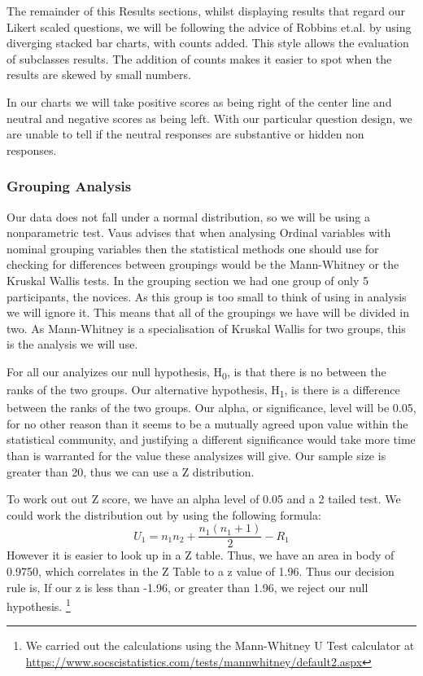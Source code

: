 The remainder of this Results sections, whilst displaying results that regard our Likert scaled questions, we will be following the advice of Robbins et.al.\cite{robbins2011plotting} by using diverging stacked bar charts, with counts added.
This style allows the evaluation of subclasses results.
The addition of counts makes it easier to spot when the results are skewed by small numbers.

In our charts we will take positive scores as being right of the center line and neutral and negative scores as being left.
With our particular question design, we are unable to tell if the neutral responses are substantive or hidden non responses\cite{blasius2001use}.

\subsubsection{Grouping Analysis}
Our data does not fall under a normal distribution, so we will be using a nonparametric test.
Vaus\cite{de2013surveys} advises that when analysing Ordinal variables with nominal grouping variables then the statistical methods one should use for checking for differences between groupings would be the Mann-Whitney\cite{mann1947test} or the Kruskal Wallis\cite{kruskal1952use} tests.
In the grouping section we had one group of only 5 participants, the novices.
As this group is too small to think of using in analysis we will ignore it.
This means that all of the groupings we have will be divided in two.
As Mann-Whitney is a specialisation of Kruskal Wallis for two groups, this is the analysis we will use.

For all our analyizes our null hypothesis, H\textsubscript{0}, is that there is no between the ranks of the two groups. 
Our alternative hypothesis, H\textsubscript{1}, is there is a difference between the ranks of the two groups.
Our alpha, or significance, level will be 0.05, for no other reason than it seems to be a mutually agreed upon value within the statistical community, and justifying a different significance would take more time than is warranted for the value these analysizes will give.
Our sample size is greater than 20, thus we can use a Z distribution.

To work out out Z score, we have an alpha level of 0.05 and a 2 tailed test.
We could work the distribution out by using the following formula:
\[U_{1}=n_{1}n_{2}+\frac{n_{1}(n_{1}+1)}{2}-R_{1}\]
However it is easier to look up in a Z table.
Thus, we have an area in body of 0.9750, which correlates in the Z Table to a z value of 1.96.
Thus our decision rule is, If our z is less than -1.96, or greater than 1.96, we reject our null hypothesis.
\footnote{We carried out the calculations using the Mann-Whitney U Test calculator at \url{https://www.socscistatistics.com/tests/mannwhitney/default2.aspx}}

